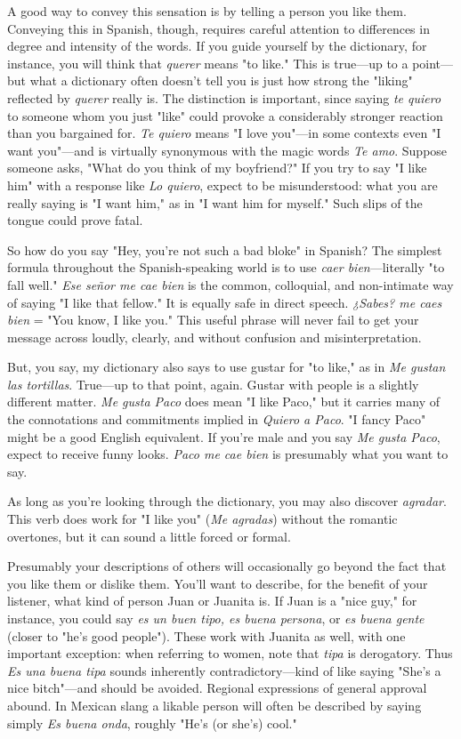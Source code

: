\documentclass[14pt,a4paper,oneside]{memoir}
\begin{document}
A good way to convey this sensation is by telling a person you
like them. Conveying this in Spanish, though, requires careful attention to differences in degree and intensity of the words. If you guide
yourself by the dictionary, for instance, you will think that \emph{querer}
means "to like." This is true---up to a point---but what a dictionary
often doesn't tell you is just how strong the "liking" reflected by
\emph{querer} really is. The distinction is important, since saying \emph{te quiero} to
someone whom you just "like" could provoke a considerably stronger
reaction than you bargained for. \emph{Te quiero} means "I love you"---in
some contexts even "I want you"---and is virtually synonymous with
the magic words \emph{Te amo}. Suppose someone asks, "What do you think
of my boyfriend?" If you try to say "I like him" with a response like \emph{Lo
	quiero}, expect to be misunderstood: what you are really saying is "I
want him," as in "I want him for myself." Such slips of the tongue
could prove fatal.

So how do you say "Hey, you're not such a bad bloke" in Spanish? The simplest formula throughout the Spanish-speaking world is to
use \emph{caer bien}---literally "to fall well." \emph{Ese señor me cae bien} is the common, colloquial, and non-intimate way of saying "I like that fellow." It
is equally safe in direct speech. \emph{¿Sabes? me caes bien} = "You know, I
like you." This useful phrase will never fail to get your message across
loudly, clearly, and without confusion and misinterpretation.

But, you say, my dictionary also says to use gustar for "to
like," as in \emph{Me gustan las tortillas}. True---up to that point, again. Gustar with people is a slightly different matter. \emph{Me gusta Paco} does mean
"I like Paco," but it carries many of the connotations and commitments implied in \emph{Quiero a Paco}. "I fancy Paco" might be a good English equivalent. If you're male and you say \emph{Me gusta Paco}, expect to
receive funny looks. \emph{Paco me cae bien} is presumably what you want
to say.

As long as you're looking through the dictionary, you may also
discover \emph{agradar}. This verb does work for "I like you" (\emph{Me agradas})
without the romantic overtones, but it can sound a little forced or
formal.

Presumably your descriptions of others will occasionally go
beyond the fact that you like them or dislike them. You'll want to
describe, for the benefit of your listener, what kind of person Juan or
Juanita is. If Juan is a "nice guy," for instance, you could say \emph{es un
	buen tipo, es buena persona}, or \emph{es buena gente} (closer to "he's good
people"). These work with Juanita as well, with one important exception: when referring to women, note that \emph{tipa} is derogatory. Thus \emph{Es
	una buena tipa} sounds inherently contradictory---kind of like saying
"She's a nice bitch"---and should be avoided. Regional expressions
of general approval abound. In Mexican slang a likable person will often be described by saying simply \emph{Es buena onda}, roughly "He's (or
she's) cool."
\end{document}
